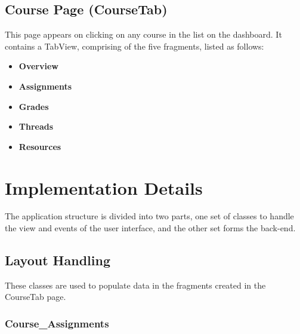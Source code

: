 \documentclass{article}
\begin{document}
\subsection{Course Page (CourseTab)}
\par\noindent This page appears on clicking on any course in the list on the dashboard. It contains a TabView, comprising of the five fragments, listed as follows:
\begin{itemize}
\item \textbf{Overview}
\item \textbf{Assignments}
\item \textbf{Grades}
\item \textbf{Threads}
\item \textbf{Resources}
\end{itemize}

\section{Implementation Details}
\par\noindent The application structure is divided into two parts, one set of classes to handle the view and events of the user interface, and the other set forms the back-end.
\subsection{Layout Handling}
\par\noindent These classes are used to populate data in the fragments created in the CourseTab page.
\subsubsection{Course\_Assignments}
\end{document}
